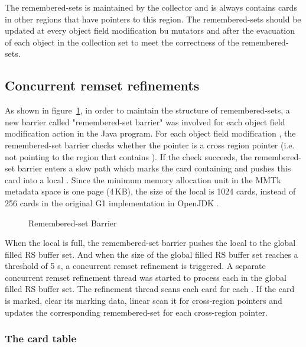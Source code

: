 The remembered-sets is maintained by the collector and is always contains cards in other regions that have pointers to this region.
The remembered-sets should be updated at every object field modification bu mutators and after
the evacuation of each object in the collection set to meet the correctness of the remembered-sets.

\subsection{Concurrent remset refinements}

As shown in figure~\ref{fig:remsetbarrier}, in order to maintain the structure of remembered-sets,
a new barrier called "remembered-set barrier" was involved for each object field modification action in the Java program.
For each object field modification , the remembered-set barrier checks
whether the pointer  is a cross region pointer (i.e. not pointing to the region that contains ).
If the check succeeds, the remembered-set barrier enters a slow path which marks the
card containing  and pushes this card into a local .
Since the minimum memory allocation unit in the MMTk metadata space is one page (4\,KB), the size of
the local  is 1024 cards, instead of 256 cards in the original G1 implementation in OpenJDK \cite{detlefs2004garbage}.

\begin{figure}
  \centering
  
  \caption{Remembered-set Barrier}
  \label{fig:remsetbarrier}
\end{figure}

When the local  is full, the remembered-set barrier
pushes the local  to the global filled RS buffer set.
And when the size of the global filled RS buffer set reaches a threshold of 5 s,
a concurrent remset refinement is triggered.
A separate concurrent remset refinement thread was started to process each
 in the global filled RS buffer set.
The refinement thread scans each card for each .
If the card is marked, clear its marking data, linear scan it for cross-region pointers
and updates the corresponding remembered-set for each cross-region pointer.

\subsubsection{The card table}

